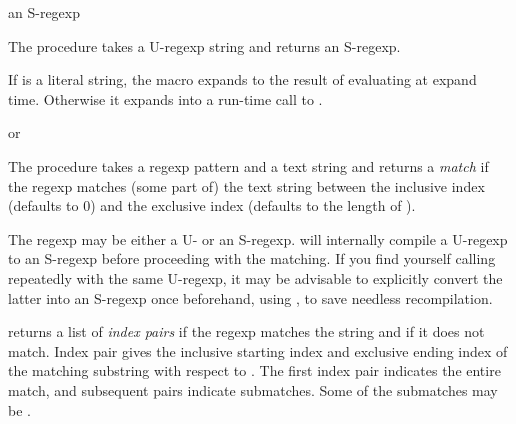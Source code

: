 \begin{procedure}
\end{procedure}
\returns{} an S-regexp

The  procedure takes a U-regexp string  and
returns an S-regexp.

\begin{syntax}
\end{syntax}
\expandsto{}

If  is a literal string, the  macro expands to the
result of evaluating  at expand time.
Otherwise it expands into a run-time call to .

\begin{procedure}
\end{procedure}
\returns{}  or 

The  procedure takes a regexp pattern
 and a text string  and returns a \emph{match} if
the regexp matches (some part of) the text string between the
inclusive  index (defaults to 0) and the exclusive
 index (defaults to the length of ).

The regexp may be either a U- or an S-regexp.
 will internally compile a U-regexp to
an S-regexp before proceeding with the matching.  If you find yourself
calling  repeatedly with the same
U-regexp, it may be advisable to explicitly convert the latter into an
S-regexp once beforehand, using , to save needless
recompilation.

 returns a list of \emph{index pairs} if
the regexp matches the string and  if it does not
match. Index pair  gives the inclusive
starting index  and exclusive ending index  of the
matching substring with respect to . The first index pair
indicates the entire match, and subsequent pairs indicate
submatches. Some of the submatches may be .

